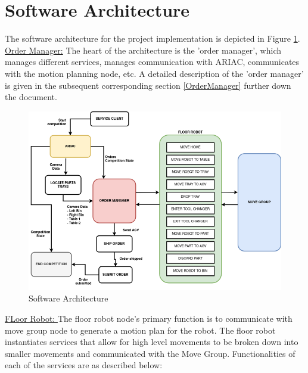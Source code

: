 \documentclass{uva-inf-article}
\begin{document}
\justifying
\section{Software Architecture}

The software architecture for the project implementation is depicted in Figure \ref{fig:swArch}.\\

\newline
\noindent \underline{Order Manager:}  The heart of the architecture is the 'order manager', which manages different services, manages communication with ARIAC, communicates with the motion planning node, etc. A detailed description of the 'order manager' is given in the subsequent corresponding section \ref{OrderManager} further down the document.\\

\newpage
\begin{figure}[h]
    \centering
    \includegraphics[scale=0.75]{images/SW_Architecture.png}
    \caption{Software Architecture}
    \label{fig:swArch}
\end{figure}
\noindent 

\noindent \underline{FLoor Robot: } The floor robot node's primary function is to communicate with move group node to generate a motion plan for the robot.  The floor robot instantiates services that allow for high level movements to be broken down into smaller movements and communicated with the Move Group.   Functionalities of each of the services are as described below:
\end{document}
